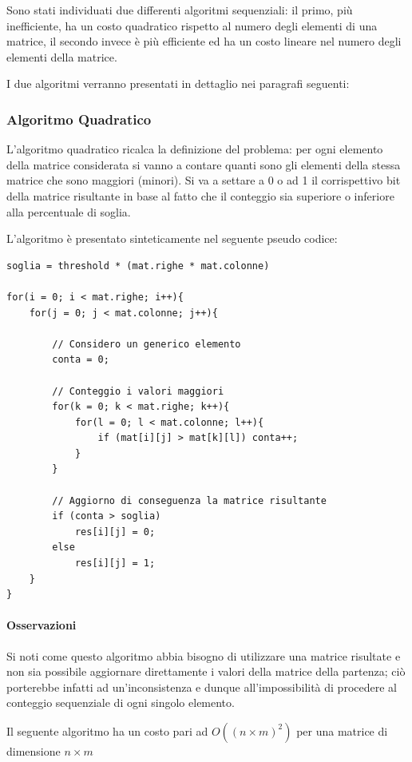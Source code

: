 \documentclass[a4paper,10pt]{article}
\begin{document}
Sono stati individuati due differenti algoritmi sequenziali: il primo, pi\`u inefficiente, ha un costo quadratico rispetto al numero degli elementi di una matrice, il secondo invece \`e pi\`u efficiente ed ha un costo lineare nel numero degli elementi della matrice.

I due algoritmi verranno presentati in dettaglio nei paragrafi seguenti:

\subsubsection{Algoritmo Quadratico}

L'algoritmo quadratico ricalca la definizione del problema: per ogni elemento della matrice considerata si vanno a contare quanti sono gli elementi della stessa matrice che sono maggiori (minori). Si va a settare a 0 o ad 1 il corrispettivo bit della matrice risultante in base al fatto che il conteggio sia superiore o inferiore alla percentuale di soglia.

L'algoritmo \`e presentato sinteticamente nel seguente pseudo codice:

\begin{lstlisting}[backgroundcolor=\color{White}, caption={Pseudo codice dell'algoritmo quadratico}]
soglia = threshold * (mat.righe * mat.colonne)

for(i = 0; i < mat.righe; i++){
	for(j = 0; j < mat.colonne; j++){
	
		// Considero un generico elemento
		conta = 0;
		
		// Conteggio i valori maggiori
		for(k = 0; k < mat.righe; k++){
			for(l = 0; l < mat.colonne; l++){
				if (mat[i][j] > mat[k][l]) conta++;
			}
		}
		
		// Aggiorno di conseguenza la matrice risultante
		if (conta > soglia)
			res[i][j] = 0;
		else
			res[i][j] = 1;
	}
}
\end{lstlisting}

\paragraph{Osservazioni}

Si noti come questo algoritmo abbia bisogno di utilizzare una matrice risultate e non sia possibile aggiornare direttamente i valori della matrice della partenza; ci\`o porterebbe infatti ad un'inconsistenza e dunque all'impossibilit\`a di procedere al conteggio sequenziale di ogni singolo elemento.

Il seguente algoritmo ha un costo pari ad $O((n \times m)^2)$ per una matrice di dimensione $n \times m$
\end{document}
